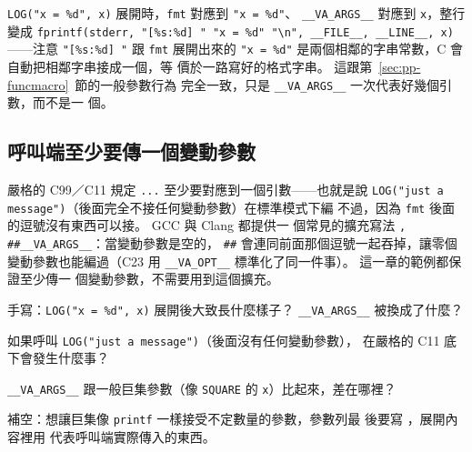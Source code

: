 
\texttt{LOG("x = \%d", x)} 展開時，\texttt{fmt} 對應到 \texttt{"x = \%d"}、
\texttt{\_\_VA\_ARGS\_\_} 對應到 \texttt{x}，整行變成
\texttt{fprintf(stderr, "[\%s:\%d] " "x = \%d" "\textbackslash n", \_\_FILE\_\_,
\_\_LINE\_\_, x)}——注意 \texttt{"[\%s:\%d] "} 跟 \texttt{fmt} 展開出來的
\texttt{"x = \%d"} 是兩個相鄰的字串常數，C 會自動把相鄰字串接成一個，等
價於一路寫好的格式字串。 這跟第~\ref{sec:pp-funcmacro}~節的一般參數行為
完全一致，只是 \texttt{\_\_VA\_ARGS\_\_} 一次代表好幾個引數，而不是一
個。

\subsection{呼叫端至少要傳一個變動參數}

嚴格的 C99／C11 規定 \texttt{...} 至少要對應到一個引數——也就是說
\texttt{LOG("just a message")}（後面完全不接任何變動參數）在標準模式下編
不過，因為 \texttt{fmt} 後面的逗號沒有東西可以接。 GCC 與 Clang 都提供一
個常見的擴充寫法 \texttt{, \#\#\_\_VA\_ARGS\_\_}：當變動參數是空的，
\texttt{\#\#} 會連同前面那個逗號一起吞掉，讓零個變動參數也能編過（C23 用
\texttt{\_\_VA\_OPT\_\_} 標準化了同一件事）。 這一章的範例都保證至少傳一
個變動參數，不需要用到這個擴充。


\begin{drills}[label=drills:pp-variadic]
\item 手寫：\texttt{LOG("x = \%d", x)} 展開後大致長什麼樣子？
\texttt{\_\_VA\_ARGS\_\_} 被換成了什麼？
\item 如果呼叫 \texttt{LOG("just a message")}（後面沒有任何變動參數），
在嚴格的 C11 底下會發生什麼事？
\item \texttt{\_\_VA\_ARGS\_\_} 跟一般巨集參數（像 \texttt{SQUARE} 的
\texttt{x}）比起來，差在哪裡？
\item 補空：想讓巨集像 \texttt{printf} 一樣接受不定數量的參數，參數列最
後要寫 \underline{\hspace{2em}}，展開內容裡用 \underline{\hspace{2em}}
代表呼叫端實際傳入的東西。
\end{drills}

